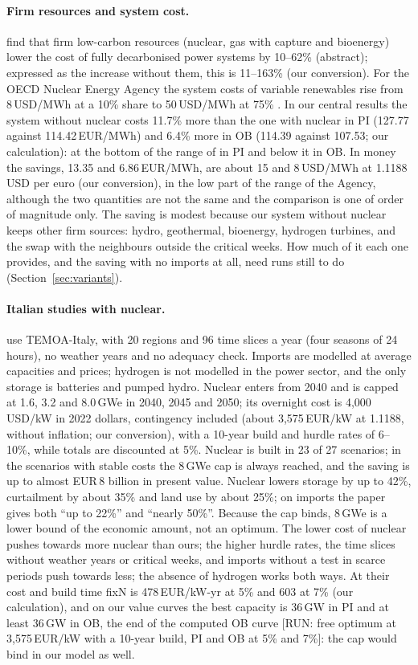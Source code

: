 \paragraph{Firm resources and system cost.} \citet{Sepulveda2018} find that firm low-carbon resources (nuclear, gas with capture and bioenergy) lower the cost of fully decarbonised power systems by 10--62\% (abstract); expressed as the increase without them, this is 11--163\% (our conversion). For the OECD Nuclear Energy Agency the system costs of variable renewables rise from 8\,USD/MWh at a 10\% share to 50\,USD/MWh at 75\% \citep{NEA2019}. In our central results the system without nuclear costs 11.7\% more than the one with nuclear in PI (127.77 against 114.42\,EUR/MWh) and 6.4\% more in OB (114.39 against 107.53; our calculation): at the bottom of the range of \citeauthor{Sepulveda2018} in PI and below it in OB. In money the savings, 13.35 and 6.86\,EUR/MWh, are about 15 and 8\,USD/MWh at 1.1188\,USD per euro (our conversion), in the low part of the range of the Agency, although the two quantities are not the same and the comparison is one of order of magnitude only. The saving is modest because our system without nuclear keeps other firm sources: hydro, geothermal, bioenergy, hydrogen turbines, and the swap with the neighbours outside the critical weeks. How much of it each one provides, and the saving with no imports at all, need runs still to do (Section~\ref{sec:variants}).

\paragraph{Italian studies with nuclear.} \citet{Mastrantuono2026} use TEMOA-Italy, with 20 regions and 96 time slices a year (four seasons of 24 hours), no weather years and no adequacy check. Imports are modelled at average capacities and prices; hydrogen is not modelled in the power sector, and the only storage is batteries and pumped hydro. Nuclear enters from 2040 and is capped at 1.6, 3.2 and 8.0\,GWe in 2040, 2045 and 2050; its overnight cost is 4{,}000\,USD/kW in 2022 dollars, contingency included (about 3{,}575\,EUR/kW at 1.1188, without inflation; our conversion), with a 10-year build and hurdle rates of 6--10\%, while totals are discounted at 5\%. Nuclear is built in 23 of 27 scenarios; in the scenarios with stable costs the 8\,GWe cap is always reached, and the saving is up to almost EUR\,8 billion in present value. Nuclear lowers storage by up to 42\%, curtailment by about 35\% and land use by about 25\%; on imports the paper gives both ``up to 22\%'' and ``nearly 50\%''. Because the cap binds, 8\,GWe is a lower bound of the economic amount, not an optimum. The lower cost of nuclear pushes towards more nuclear than ours; the higher hurdle rates, the time slices without weather years or critical weeks, and imports without a test in scarce periods push towards less; the absence of hydrogen works both ways. At their cost and build time fixN is 478\,EUR/kW-yr at 5\% and 603 at 7\% (our calculation), and on our value curves the best capacity is 36\,GW in PI and at least 36\,GW in OB, the end of the computed OB curve [RUN: free optimum at 3{,}575\,EUR/kW with a 10-year build, PI and OB at 5\% and 7\%]: the cap would bind in our model as well.

